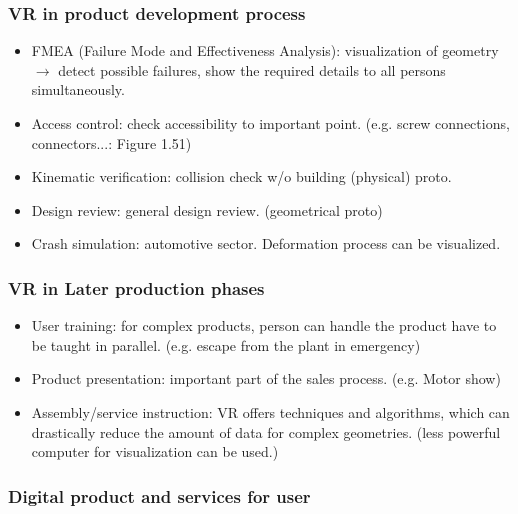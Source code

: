 \documentclass{standalone}
\begin{document}
\subsubsection*{VR in product development process}

\begin{itemize}
	\item FMEA (Failure Mode and Effectiveness Analysis): visualization of geometry $\rightarrow$ detect possible failures, show the required details to all persons simultaneously.
	\item Access control: check accessibility to important point. (e.g. screw connections, connectors...: Figure 1.51)
	\item Kinematic verification: collision check w/o building (physical) proto.
	\item Design review: general design review. (geometrical proto)
	\item Crash simulation: automotive sector. Deformation process can be visualized.  
\end{itemize}

\subsubsection*{VR in Later production phases}

\begin{itemize}
	\item User training: for complex products, person can handle the product have to be taught in parallel. (e.g. escape from the plant in emergency)
	\item Product presentation: important part of the sales process. (e.g. Motor show)
	\item Assembly/service instruction: VR offers techniques and algorithms, which can drastically reduce the amount of data for complex geometries. (less powerful computer for visualization can be used.)
\end{itemize}

\subsubsection*{Digital product and services for user}
\end{document}
